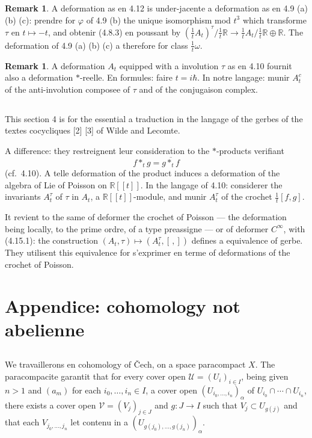 \documentclass[11pt,a4paper]{article}
\theoremstyle{plain}
\theoremstyle{definition}
\newtheorem{remark}[theorem]{Remark}
\newcommand{\R}{\mathbb{R}}
\begin{document}
\begin{remark}
A deformation as en 4.12 is under-jacente a deformation as en 4.9 (a) (b) (c): prendre for $\varphi$ of 4.9 (b) the unique isomorphism mod $t^{3}$ which transforme $\tau$ en $t \mapsto -t$, and obtenir (4.8.3) en poussant by $(\tfrac{1}{t}A_{t})^{\tau}/\tfrac{1}{t}\R \to \tfrac{1}{t}A_{t}/\tfrac{1}{t}\R \oplus \R$. The deformation of 4.9 (a) (b) (c) a therefore for class $\tfrac{1}{t}\omega$.
\end{remark}

\begin{remark}
A deformation $A_{t}$ equipped with a involution $\tau$ as en 4.10
fournit also a deformation $*$-reelle. En formules: faire $t = i\hbar$. In notre langage:
munir $A_{t}^{c}$ of the anti-involution composee of $\tau$ and of the conjugaison complex.
\end{remark}

\subsection{}
This section 4 is for the essential a traduction in the langage of the gerbes
of the textes cocycliques [2] [3] of Wilde and Lecomte.

A difference: they restreignent leur consideration to the $*$-products verifiant
\begin{equation}
f *_{t} g = \overline{g *_{t} f} \tag{4.15.1}
\end{equation}
(cf.~4.10). A telle deformation of the product induces a deformation of the algebra of
Lie of Poisson on $\R[[t]]$. In the langage of 4.10: considerer the invariants $A_{t}^{\tau}$ of
$\tau$ in $A_{t}$, a $\R[[t]]$-module, and munir $A_{t}^{\tau}$ of the crochet $\tfrac{1}{t}[f,g]$.

It revient to the same of deformer the crochet of Poisson --- the deformation being locally, to the prime ordre, of a type preassigne --- or of deformer $C^{\infty}$, with (4.15.1):
the construction $(A_{t}, \tau) \mapsto (A_{t}^{\tau}, [\,,])$ defines a equivalence of gerbe. They utilisent
this equivalence for s'exprimer en terme of deformations of the crochet of Poisson.

\section*{Appendice: cohomology not abelienne}

\subsection{}
We travaillerons en cohomology of \v{C}ech, on a space paracompact $X$.
The paracompacite garantit that for every cover open $\mathcal{U} = (U_{i})_{i \in I}$, being
given $n > 1$ and $(a_{m})$ for each $i_{0}, \ldots, i_{n} \in I$, a cover open $(U_{i_{0}, \ldots, i_{n}})_{\alpha}$ of $U_{i_{0}} \cap \cdots \cap U_{i_{n}}$, there exists a cover open $\mathcal{V} = (V_{j})_{j \in J}$ and $g: J \to I$ such that $V_{j} \subset U_{g(j)}$
and that each $V_{j_{0}, \ldots, j_{n}}$ let contenu in a $(U_{g(j_{0}), \ldots, g(j_{n})})_{\alpha}$.
\end{document}
